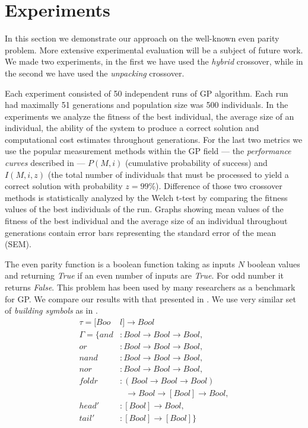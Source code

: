 \documentclass{sig-alternate}
\newcommand{\ar}{\rightarrow\xspace}
\begin{document}
\section{Experiments}
\label{experiments}

In this section we demonstrate our approach on the well-known even parity problem. More extensive experimental evaluation will be a subject of future work. 
We made two experiments, in the first we have used the \textit{hybrid} crossover, while in the second we have used the \textit{unpacking} crossover. 

Each experiment consisted of 50 independent runs 
of GP algorithm. Each run had maximally 51 generations and population size
was 500 individuals.
In the experiments we analyze the fitness of the best individual,
the average size of an individual,
the ability of the system to produce a correct solution 
and computational cost estimates throughout generations. 
For the last two metrics we use the popular measurement  
methods within the GP field --- the \textit{performance curves}
described in \cite{koza92} --- $P(M,i)$ (cumulative probability of success) 
and $I(M,i,z)$ (the total number of individuals that must be processed 
to yield a correct solution with probability $z =99\%$).
Difference of those two crossover methods is statistically analyzed by the Welch t-test by comparing the fitness values of the best individuals of the run. 
Graphs showing mean values of the fitness of the best individual and
the average size of an individual throughout generations contain error bars representing the standard error of the mean (SEM).

The even parity function is a boolean function taking as inputs $N$
boolean values and returning \textit{True} if an even number of inputs 
are \textit{True}. For odd number it returns \textit{False}.
This problem has been used by many researchers
as a benchmark for GP. 
We compare our results with that presented in \cite{yu01, kes}.
We use very similar set of \textit{building symbols} as in \cite{yu01}. 
\begin{align*}
\tau = [Boo&l] \ar Bool\\
\Gamma = \{
  and   &: Bool \ar Bool \ar Bool    ,\\
  or    &: Bool \ar Bool \ar Bool    ,\\
  nand  &: Bool \ar Bool \ar Bool    ,\\
  nor   &: Bool \ar Bool \ar Bool    ,\\
  foldr &: (Bool \ar Bool \ar Bool) \\
        &~~~\ar Bool \ar [Bool] \ar Bool ,\\
  head' &: [Bool] \ar Bool ,\\
  tail' &: [Bool] \ar [Bool]        \}
\end{align*}
\end{document}
